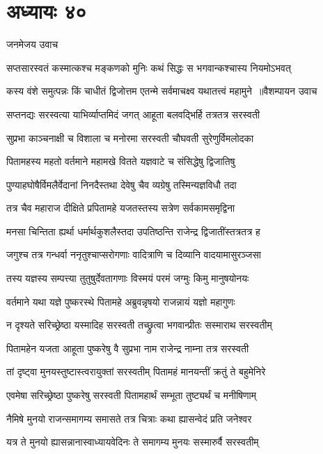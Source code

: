 \chapter{अध्यायः ४०}
\twolineshloka
{जनमेजय उवाच}
{}


\twolineshloka
{सप्तसारस्वतं कस्मात्कश्च मङ्कणको मुनिः}
{कथं सिद्धः स भगवान्कश्चास्य नियमोऽभवत्}


\threelineshloka
{कस्य वंशे समुत्पन्नः किं चाधीतं द्विजोत्तम}
{एतन्मे सर्वमाचक्ष्व यथातत्त्वं महामुने ॥वैशम्पायन उवाच}
{}


\twolineshloka
{सप्तनद्यः सरस्वत्या याभिर्व्याप्तमिदं जगत्}
{आहूता बलवद्भिर्हि तत्रतत्र सरस्वती}


\twolineshloka
{सुप्रभा काञ्चनाक्षी च विशाला च मनोरमा}
{सरस्वती चौघवती सुरेणुर्विमलोदका}


\twolineshloka
{पितामहस्य महतो वर्तमाने महामखे}
{वितते यज्ञवाटे च संसिद्धेषु द्विजातिषु}


\twolineshloka
{पुण्याहघोषैर्विमलैर्वेदानां निनदैस्तथा}
{देवेषु चैव व्यग्रेषु तस्मिन्यज्ञविधौ तदा}


\twolineshloka
{तत्र चैव महाराज दीक्षिते प्रपितामहे}
{यजतस्तस्य सत्रेण सर्वकामसमृद्विना}


\twolineshloka
{मनसा चिन्तिता ह्यर्था धर्मार्थकुशलैस्तदा}
{उपतिष्ठन्ति राजेन्द्र द्विजातींस्तत्रतत्र ह}


\twolineshloka
{जगुश्च तत्र गन्धर्वा ननृतुश्चाप्सरोगणाः}
{वादित्राणि च दिव्यानि वादयामासुरञ्जसा}


\twolineshloka
{तस्य यज्ञस्य सम्पत्त्या तुतुषुर्देवतागणाः}
{विस्मयं परमं जग्मुः किमु मानुषयोनयः}


\twolineshloka
{वर्तमाने यथा यज्ञे पुष्करस्थे पितामहे}
{अब्रुवन्नृषयो राजन्नायं यज्ञो महागुणः}


\twolineshloka
{न दृश्यते सरिच्छ्रेष्ठा यस्मादिह सरस्वती}
{तच्छ्रुत्वा भगवान्प्रीतः सस्माराथ सरस्वतीम्}


\twolineshloka
{पितामहेन यजता आहूता पुष्करेषु वै}
{सुप्रभा नाम राजेन्द्र नाम्ना तत्र सरस्वती}


\twolineshloka
{तां दृष्ट्वा मुनयस्तुष्टास्त्वरायुक्तां सरस्वतीम्}
{पितामहं मानयन्तीं क्रतुं ते बहुमेनिरे}


\twolineshloka
{एवमेषा सरिच्छ्रेष्ठा पुष्करेषु सरस्वती}
{पितामहार्थं सम्भूता तुष्ट्यर्थं च मनीषिणाम्}


\twolineshloka
{नैमिषे मुनयो राजन्समागम्य समासते}
{तत्र चित्राः कथा ह्यासन्वेदं प्रति जनेश्वर}


\twolineshloka
{यत्र ते मुनयो ह्यासन्नानास्वाध्यायवेदिनः}
{ते समागम्य मुनयः सस्मारुर्वै सरस्वतीम्}


